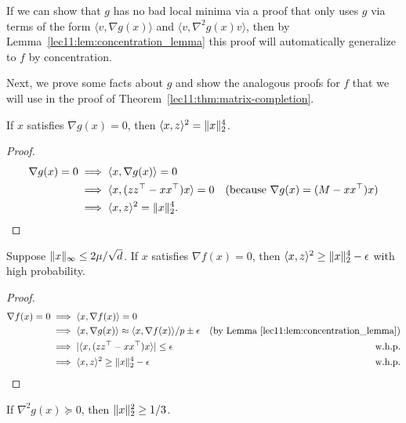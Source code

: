 If we can show that $g$ has no bad local minima via a proof that only uses $g$ via terms of the form $\langle v, \nabla g(x) \rangle$ and $\langle v, \nabla^2 g(x) v \rangle$, then by Lemma~\ref{lec11:lem:concentration_lemma} this proof will automatically generalize to $f$ by concentration.

Next, we prove some facts about $g$ and show the analogous proofs for $f$ that we will use in the proof of Theorem~\ref{lec11:thm:matrix-completion}.

\begin{lemma}\label{lec11:lem:inner-g}
If $x$ satisfies $\nabla g(x) = 0$, then $\langle x,z \rangle^2 = \|x\|_2^4$.
\end{lemma}

\begin{proof}
\begin{align}
    \nabla g(x) = 0 &\implies \langle x, \nabla g(x) \rangle = 0 \\
   & \implies \langle x, (zz^\top-xx^\top)x \rangle = 0 & ({\textup{because}~} \nabla g(x) = (M - xx^\top)x) \\
   & \implies \langle x,z \rangle^2 = \|x\|_2^4.
\end{align}
\end{proof}

\begin{lemma}\label{lec11:lem:inner-f}
Suppose $\|x\|_\infty \leq 2\mu / \sqrt{d}$. If $x$ satisfies $\nabla f(x) = 0$, then $\langle x,z \rangle^2 \geq \|x\|_2^4 - \epsilon$ with high probability.
\label{inner_prod_norm_f}
\end{lemma}

\begin{proof}
\begin{align}
    \nabla f(x) = 0 &\implies \langle x, \nabla f(x) \rangle = 0 \\
    & \implies \langle x, \nabla g(x) \rangle \approx \langle x, \nabla f(x) \rangle/p \pm \epsilon & \text{(by Lemma \ref{lec11:lem:concentration_lemma})} \\
   & \implies |\langle x, (zz^\top-xx^\top)x \rangle| \leq \epsilon & \text{w.h.p.} \\
   & \implies \langle x,z \rangle^2 \geq \|x\|_2^4 - \epsilon & \text{w.h.p.}
\end{align}
\end{proof}

\begin{lemma}\label{lec11:lem:bound-g}
    If $\nabla^2 g(x) \succeq 0$, then $\|x\|_2^2 \geq 1/3$.
\end{lemma}

